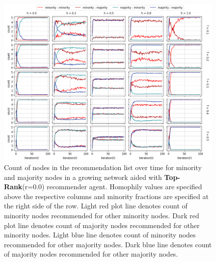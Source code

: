 \begin{appendices}
\begin{figure}[h!]
	\centering
	\includegraphics[width=1.0\textwidth]{images/count_top00.png}
	\caption{Count of nodes in the recommendation list over time for minority and majority nodes in a growing network aided with \textbf{Top-Rank}(r=0.0) recommender agent. Homophily values are specified above the respective columns and minority fractions are specified at the right side of the row. Light red plot line denotes count of minority nodes recommended for other minority nodes. Dark red plot line denotes count of majority nodes recommended for other minority nodes. Light blue line denotes count of minority nodes recommended for other majority nodes. Dark blue line denotes count of majority nodes recommended for other majority nodes.}
	\label{count_top00}
\end{figure}


\end{appendices}
